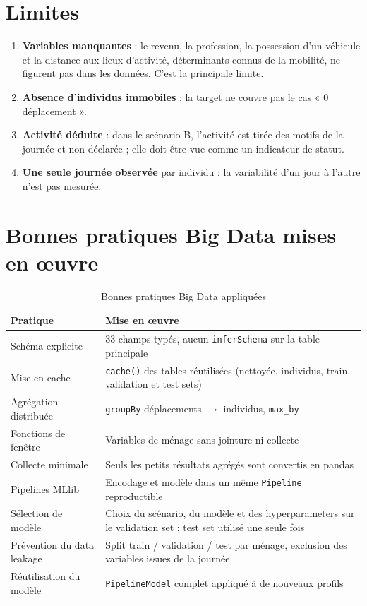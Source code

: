 \documentclass[12pt,a4paper]{report}
\newcommand{\code}[1]{\texttt{\small #1}}
\newcommand{\1}{\mathbf{1}}
\begin{document}
\section{Limites}
\begin{enumerate}
  \item \textbf{Variables manquantes} : le revenu, la profession, la possession d'un véhicule et la distance aux lieux d'activité, déterminants connus de la mobilité, ne figurent pas dans les données. C'est la principale limite.
  \item \textbf{Absence d'individus immobiles} : la target ne couvre pas le cas « 0 déplacement ».
  \item \textbf{Activité déduite} : dans le scénario B, l'activité est tirée des motifs de la journée et non déclarée ; elle doit être vue comme un indicateur de statut.
  \item \textbf{Une seule journée observée} par individu : la variabilité d'un jour à l'autre n'est pas mesurée.
\end{enumerate}

\section{Bonnes pratiques Big Data mises en œuvre}
\begin{table}[H]
\centering
\caption{Bonnes pratiques Big Data appliquées}\label{tab:pratiques}
\small
\begin{tabularx}{\linewidth}{@{}lX@{}}
\toprule
\textbf{Pratique} & \textbf{Mise en œuvre} \\
\midrule
Schéma explicite & 33 champs typés, aucun \code{inferSchema} sur la table principale \\
Mise en cache & \code{cache()} des tables réutilisées (nettoyée, individus, train, validation et test sets) \\
Agrégation distribuée & \code{groupBy} déplacements \(\rightarrow\) individus, \code{max\_by} \\
Fonctions de fenêtre & Variables de ménage sans jointure ni collecte \\
Collecte minimale & Seuls les petits résultats agrégés sont convertis en pandas \\
Pipelines MLlib & Encodage et modèle dans un même \code{Pipeline} reproductible \\
Sélection de modèle & Choix du scénario, du modèle et des hyperparameters sur le validation set ; test set utilisé une seule fois \\
Prévention du data leakage & Split train / validation / test par ménage, exclusion des variables issues de la journée \\
Réutilisation du modèle & \code{PipelineModel} complet appliqué à de nouveaux profils \\
\bottomrule
\end{tabularx}
\end{table}
\end{document}

